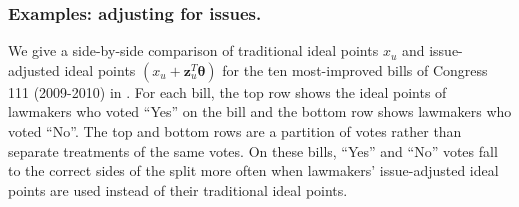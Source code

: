 \subsubsection{Examples: adjusting for issues.}
We give a side-by-side comparison of traditional ideal points $x_u$
and issue-adjusted ideal points $(x_u + \bm z_u^T \bm \theta)$ for the
ten most-improved bills of Congress 111 (2009-2010) in
.  For each bill, the top row shows the
ideal points of lawmakers who voted ``Yes'' on the bill and the bottom
row shows lawmakers who voted ``No''.  The top and bottom rows are a
partition of votes rather than separate treatments of the same votes.
On these bills, ``Yes'' and ``No'' votes fall to the correct sides of
the split more often when lawmakers' issue-adjusted ideal points are
used instead of their traditional ideal points.

